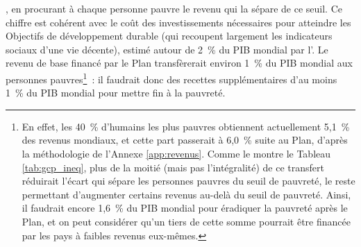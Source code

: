 \documentclass[a5paper,french,openany]{memoir}
\begin{document}
, en procurant à chaque personne pauvre le revenu qui la sépare de ce seuil. Ce chiffre est cohérent avec le coût des investissements nécessaires pour atteindre les Objectifs de développement durable (qui recoupent largement les indicateurs sociaux d'une vie décente), estimé autour de 2~\% du PIB mondial par l'\cite{cnuced_estimating_2021}. %
Le revenu de base financé par le Plan transfèrerait environ 1~\% du PIB mondial aux personnes pauvres\footnote{En effet, les 40~\% d'humains les plus pauvres obtiennent actuellement 5,1~\% des revenus mondiaux, et cette part passerait à 6,0~\% suite au Plan, d'après la méthodologie de l'Annexe \ref{app:revenus}. Comme le montre le Tableau \ref{tab:gcp_ineq}, plus de la moitié (mais pas l'intégralité) de ce transfert réduirait l'écart qui sépare les personnes pauvres du seuil de pauvreté, le reste permettant d'augmenter certains revenus au-delà du seuil de pauvreté. Ainsi, il faudrait encore 1,6~\% du PIB mondial pour éradiquer la pauvreté après le Plan, et on peut considérer qu'un tiers de cette somme pourrait être financée par les pays à faibles revenus eux-mêmes.}~: %
il faudrait donc des recettes supplémentaires d'au moins 1~\% du PIB mondial pour mettre fin à la pauvreté. %
\end{document}
